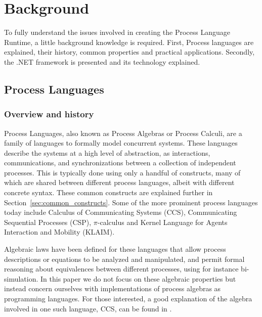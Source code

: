 \chapter{Background}

	To fully understand the issues involved in creating the Process Language 
	Runtime, a little background knowledge is required. First, Process 
	languages are explained, their history, common properties and practical 
	applications. Secondly, the .NET framework is presented and its technology
	explained.

\section{Process Languages}

\subsection{Overview and history}

	Process Languages, also known as Process Algebras or Process Calculi, are a
	family of languages to formally model concurrent systems. These languages 
	describe the systems at a high level of abstraction, as interactions, 
	communications, and synchronizations between a collection of independent
	processes. This is typically done using only a handful of constructs, many 
	of which are shared between different process languages, albeit 
	with different concrete syntax. These common constructs are explained 
	further in Section~\ref{sec:common_constructs}. Some of the more prominent 
	process languages today include Calculus of Communicating Systems (CCS), 
	Communicating Sequential Processes (CSP), $\pi$-calculus and Kernel Language 
	for Agents Interaction and Mobility (KLAIM).
	
	Algebraic laws have been defined for these languages that allow process 
	descriptions or equations to be analyzed and manipulated, and permit formal 
	reasoning about equivalences between different processes, using for instance 
	bi-simulation. In this paper we do not focus on these algebraic properties 
	but instead concern ourselves with implementations of process algebras as 
	programming languages. For those interested, a good explanation of the 
	algebra involved in one such language, CCS, can be found in \cite{reactive}.
	
